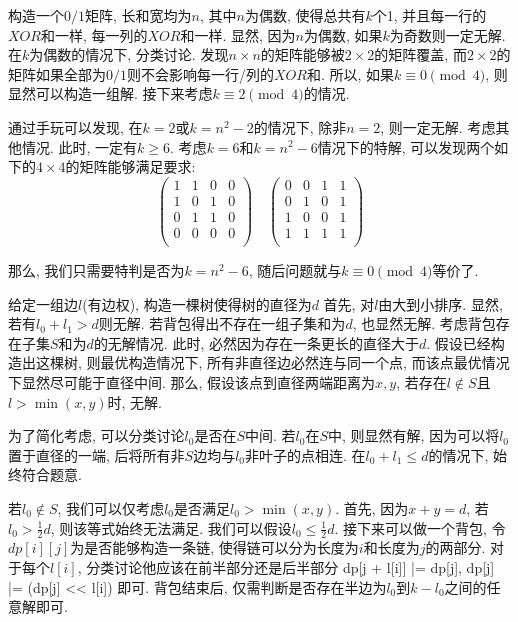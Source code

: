 \prob 构造一个$0/1$矩阵, 长和宽均为$n$, 其中$n$为偶数, 使得总共有$k$个1, 并且每一行的$XOR$和一样, 每一列的$XOR$和一样.
\sol 显然, 因为$n$为偶数, 如果$k$为奇数则一定无解. 在$k$为偶数的情况下, 分类讨论. 发现$n\times n$的矩阵能够被$2 \times 2$的矩阵覆盖, 而$2 \times 2$的矩阵如果全部为$0/1$则不会影响每一行/列的$XOR$和. 所以, 如果$k \equiv 0 \pmod{4}$, 则显然可以构造一组解. 接下来考虑$k \equiv 2 \pmod{4}$的情况.

通过手玩可以发现, 在$k = 2$或$k = n^2 - 2$的情况下, 除非$n=2$, 则一定无解. 考虑其他情况. 此时, 一定有$k \geq 6$. 考虑$k = 6$和$k = n^2 - 6$情况下的特解, 可以发现两个如下的$4 \times 4$的矩阵能够满足要求:
$$
\begin{pmatrix}
1 & 1 & 0 & 0 \\
1 & 0 & 1 & 0 \\
0 & 1 & 1 & 0 \\
0 & 0 & 0 & 0 \\
\end{pmatrix}
\quad
\begin{pmatrix}
0 & 0 & 1 & 1 \\
0 & 1 & 0 & 1 \\
1 & 0 & 0 & 1 \\
1 & 1 & 1 & 1 \\
\end{pmatrix}
$$

那么, 我们只需要特判是否为$k = n^2-6$, 随后问题就与$k \equiv 0 \pmod{4}$等价了.

\prob 给定一组边$l$(有边权), 构造一棵树使得树的直径为$d$
\sol 首先, 对$l$由大到小排序. 显然, 若有$l_0 + l_1 > d$则无解. 若背包得出不存在一组子集和为$d$, 也显然无解. 考虑背包存在子集$S$和为$d$的无解情况. 此时, 必然因为存在一条更长的直径大于$d$. 假设已经构造出这棵树, 则最优构造情况下, 所有非直径边必然连与同一个点, 而该点最优情况下显然尽可能于直径中间. 那么, 假设该点到直径两端距离为$x, y$, 若存在$l \not \in S$且$l > \min(x,y)$时, 无解.

为了简化考虑, 可以分类讨论$l_0$是否在$S$中间. 若$l_0$在$S$中, 则显然有解, 因为可以将$l_0$置于直径的一端, 后将所有非$S$边均与$l_0$非叶子的点相连. 在$l_0 + l_1 \leq d$的情况下, 始终符合题意.

若$l_0 \not \in S$, 我们可以仅考虑$l_0$是否满足$l_0 > \min(x,y)$. 首先, 因为$x + y = d$, 若$l_0 > \frac{1}{2} d$, 则该等式始终无法满足. 我们可以假设$l_0 \leq \frac{1}{2}d$. 接下来可以做一个背包, 令$dp[i][j]$为是否能够构造一条链, 使得链可以分为长度为$i$和长度为$j$的两部分. 对于每个$l[i]$, 分类讨论他应该在前半部分还是后半部分 dp[j + l[i]] |= dp[j], dp[j] |= (dp[j] << l[i]) 即可. 背包结束后, 仅需判断是否存在半边为$l_0$到$k - l_0$之间的任意解即可.

